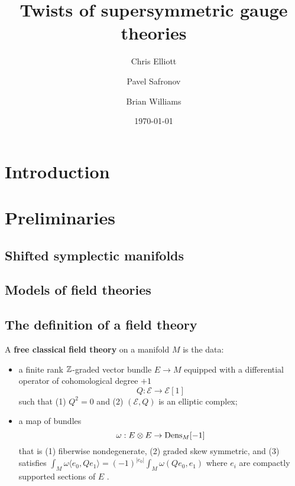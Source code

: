 \documentclass[10pt, oneside]{article}
\title{Twists of supersymmetric gauge theories}
\author{Chris Elliott\and Pavel Safronov \and Brian Williams}
\date{\today}
\def\cE{\mathcal E}\def\cF{\mathcal F}\def\cG{\mathcal G}\def\cH{\mathcal H}
\def\<{\langle}
\def\>{\rangle}
\begin{document}
\maketitle

\section{Introduction}

\section{Preliminaries}

\subsection{Shifted symplectic manifolds}


\subsection{Models of field theories}

\subsection{The definition of a field theory}

\begin{dfn}
A {\bf free classical field theory} on a manifold $M$ is the data:
\begin{itemize}
\item a finite rank $\mathbb Z$-graded vector bundle $E \to M$ equipped with a differential operator of cohomological degree $+1$
\[
Q : \cE \to \cE [1] 
\]
such that (1) $Q^2 = 0$ and (2) $(\cE , Q)$ is an elliptic complex;
\item a map of bundles
\[
\omega : E \otimes E \to {\rm Dens}_M [-1]
\]
that is (1) fiberwise nondegenerate, (2) graded skew symmetric, and (3) satisfies $\int_M \omega\<e_0, Qe_1\> = (-1)^{|e_0|} \int_M \omega(Q e_0, e_1)$ where $e_i$ are compactly supported sections of $E$ .
\end{itemize}
\end{dfn}

\end{document}
